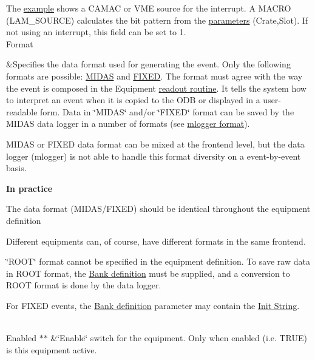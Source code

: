 \begin{table}[h]
\begin{TabularC}{3}
The \hyperlink{FE_eq_event_routines_FE_poll_or_interrupt_readout_routine}{example} shows a CAMAC or VME source for the interrupt. A MACRO (LAM\_\-SOURCE) calculates the bit pattern from the \hyperlink{structparameters}{parameters} (Crate,Slot). If not using an interrupt, this field can be set to 1.   \\
\label{FE_table_FE_tbl_Format}
\hypertarget{FE_table_FE_tbl_Format}{}
 \label{FE_table_idx_event_format}
\hypertarget{FE_table_idx_event_format}{}
   Format\par
  &Specifies the data format used for generating the event. Only the following formats are possible: \hyperlink{FE_Data_format_FE_Midas_format}{MIDAS} and \hyperlink{FE_bank_construction_FE_FIXED_event_readout}{FIXED}. The format must agree with the way the event is composed in the Equipment \hyperlink{FE_table_FE_tbl_ReadoutRoutine}{readout routine}. It tells the system how to interpret an event when it is copied to the ODB or displayed in a user-\/readable form. Data in \char`\"{}MIDAS\char`\"{} and/or \char`\"{}FIXED\char`\"{} format can be saved by the MIDAS data logger in a number of formats (see \hyperlink{F_Logging_Data_F_Logger_CS_Format}{mlogger format}).  
\begin{DoxyItemize}
\item MIDAS or FIXED data format can be mixed at the frontend level, but the data logger (mlogger) is not able to handle this format diversity on a event-\/by-\/event basis. \par
{\bfseries In practice 
\begin{DoxyEnumerate}
\item The data format (MIDAS/FIXED) should be identical throughout the equipment definition 
\item Different equipments can, of course, have different formats in the same frontend. 
\end{DoxyEnumerate}} 
\item \char`\"{}ROOT\char`\"{} format cannot be specified in the equipment definition. To save raw data in ROOT format, the \hyperlink{FE_table_FE_tbl_BankDef}{Bank definition} must be supplied, and a conversion to ROOT format is done by the data logger. 
\item For FIXED events, the \hyperlink{FE_table_FE_tbl_BankDef}{Bank definition} parameter may contain the \hyperlink{FE_table_FE_tbl_InitString}{Init String}. 
\end{DoxyItemize}\\
 \label{FE_table_FE_tbl_EqEnabled}
\hypertarget{FE_table_FE_tbl_EqEnabled}{}
 \label{FE_table_idx_equipment_enable}
\hypertarget{FE_table_idx_equipment_enable}{}
  Enabled \hyperlink{FE_eqdec_FE_equipment_odb_common}{$\ast$$\ast$}   &\char`\"{}Enable\char`\"{} switch for the equipment. Only when enabled (i.e. TRUE) is this equipment active.   \\
\label{FE_table_FE_tbl_ReadOn}
\hypertarget{FE_table_FE_tbl_ReadOn}{}
 \label{FE_table_idx_event_readout_flags}
\hypertarget{FE_table_idx_event_readout_flags}{}



\end{TabularC}
\end{table}
